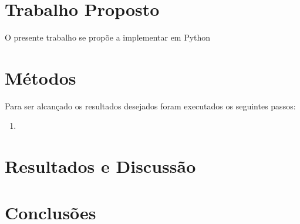 \documentclass[twoside,conference,a4paper]{IEEEtran}
\begin{document}
\section{Trabalho Proposto}

O presente trabalho se propõe a implementar em Python
\section{Métodos}

Para ser alcançado os resultados desejados foram executados os seguintes passos:
\begin{enumerate}
 \item
\end{enumerate}


\section{Resultados e Discussão}

\section{Conclusões}

\nocite{Aula}



\end{document}
